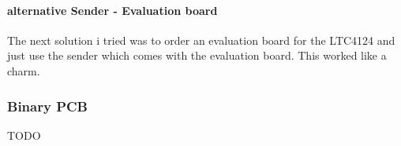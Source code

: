 \paragraph{alternative Sender - Evaluation board}
The next solution i tried was to order an evaluation board for the LTC4124 and just use the sender which comes with the evaluation board.
This worked like a charm.
\subsubsection{Binary PCB}
TODO
